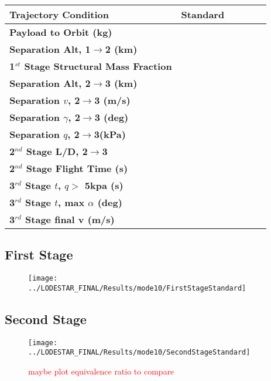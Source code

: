 \begin{table}[ht]
	\centering
	\begin{tabular}{l c c c c c} 
		\hline \textbf{Trajectory Condition}
		&Standard
		\\
		\hline \textbf{Payload to Orbit (kg)}
		& \PayloadToOrbitStandardNoReturn
		\\
		\textbf{Separation Alt, 1$\rightarrow$2 (km)}
		& \firstsecondSeparationAltStandardNoReturn
		\\
		\textbf{1$^{st}$ Stage Structural Mass Fraction}
		& \FirstStageSMFStandardNoReturn
		\\
		\textbf{Separation Alt, 2$\rightarrow$3 (km)}
		& \secondthirdSeparationAltStandardNoReturn
		\\
		\textbf{Separation $v$, 2$\rightarrow$3 (m/s)}
		& \secondthirdSeparationvStandardNoReturn
		\\
		\textbf{Separation $\gamma$, 2$\rightarrow$3 (deg)}
		& \secondthirdSeparationgammaStandardNoReturn
		\\
		\textbf{Separation $q$, 2$\rightarrow$3(kPa)}
		& \secondthirdSeparationqStandardNoReturn
		\\
		\textbf{2$^{nd}$ Stage L/D, 2$\rightarrow$3}
		& \secondthirdSeparationLDStandardNoReturn
		\\
		\textbf{2$^{nd}$ Stage Flight Time (s)}
		& \secondFlightTimeStandardNoReturn
		\\
		\textbf{3$^{rd}$ Stage $t$, $q >$ 5kpa (s)}
		& \thirdqOverFiveStandardNoReturn
		\\
		\textbf{3$^{rd}$ Stage $t$, max $\alpha$ (deg)}
		& \thirdmaxAoAStandardNoReturn
		\\
		\hline \textbf{3$^{rd}$ Stage final v (m/s)}
		& \thirdcircvStandardNoReturn
		\\
		\hline 
	\end{tabular} 
	\label{tab:summaryStandardNoReturn}
\end{table}



\subsection{First Stage}
\begin{figure}[ht]
\centering
\texttt{[image: ../LODESTAR\_FINAL/Results/mode10/FirstStageStandard]}
\caption{}
\label{fig:FirstStageStandardNoReturn}
\end{figure}

\subsection{Second Stage}
\begin{figure}[ht]
\centering
\texttt{[image: ../LODESTAR\_FINAL/Results/mode10/SecondStageStandard]}
\caption{\textcolor{red}{maybe plot equivalence ratio to compare}}
\label{fig:SecondStageStandardNoReturn}
\end{figure}




